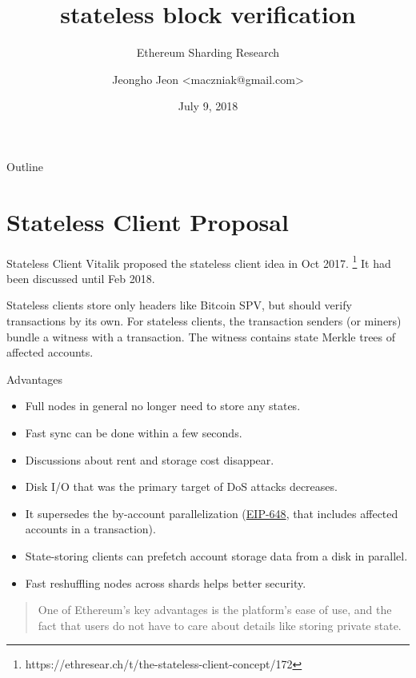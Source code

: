 \documentclass{beamer}
\title{stateless block verification}
\subtitle{Ethereum Sharding Research}
\date{July 9, 2018}
\author{Jeongho Jeon <maczniak@gmail.com>}
\institute{\textbf{Whitepaper} Foundation, Nonce\\%
(for internal discussion purposes only)}
\begin{document}
\maketitle

\begin{frame}{Outline}
  \tableofcontents
\end{frame}

\section{Stateless Client Proposal}
\begin{frame}{Stateless Client}
  Vitalik proposed the stateless client idea in Oct 2017.%
  \footnote{https://ethresear.ch/t/the-stateless-client-concept/172}
  It had been discussed until Feb 2018.

  Stateless clients store only headers like Bitcoin SPV, but should verify
  transactions by its own. For stateless clients, the transaction senders (or miners)
  bundle a witness with a transaction. The witness contains state Merkle trees
  of affected accounts.
\end{frame}

\begin{frame}{Advantages}
  \begin{itemize}
    \item Full nodes in general no longer need to store any states.
    \item Fast sync can be done within a few seconds.
    \item Discussions about rent and storage cost disappear.
    \item Disk I/O that was the primary target of DoS attacks decreases.
    \item It supersedes the by-account parallelization (\href{https://github.com/ethereum/EIPs/issues/648}{EIP-648}, that includes affected accounts in a transaction).
    \item State-storing clients can prefetch account storage data from a disk in parallel.
    \item Fast reshuffling nodes across shards helps better security.
  \end{itemize}
\end{frame}

\begin{frame}
  \begin{quote}
    One of Ethereum's key advantages is the platform's ease of use, and the fact that users do not have to care about details like storing private state.
  \end{quote}
\end{frame}
\end{document}
